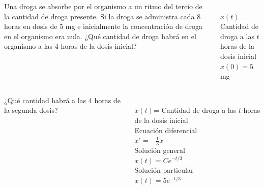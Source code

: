 \documentclass[aspectratio=149,10pt,xcolor=dvipsnames,t]{beamer}
\begin{document}
\begin{frame}
\begin{columns}
\begin{column}[T]{0.65\textwidth}
Una droga se absorbe por el organismo a un ritmo del tercio de la cantidad de droga presente. 
Si la droga se administra cada 8 horas en dosis de 5 mg e inicialmente la concentración de droga en el organismo era nula.
¿Qué cantidad de droga habrá en el organismo a las 4 horas de la dosis inicial?
\end{column}
\begin{column}[T]{0.35\textwidth}
\\
$x(t)$= Cantidad de droga a las $t$ horas de la dosis inicial\\
$x(0)= 5$ mg
\end{column}
\end{columns}
\end{frame}


\begin{frame}
\begin{columns}
\begin{column}[T]{0.65\textwidth}
¿Qué cantidad habrá a las 4 horas de la segunda dosis? 
\end{column}
\begin{column}[T]{0.35\textwidth}
\\
$x(t)$= Cantidad de droga a las $t$ horas de la dosis inicial\\
Ecuación diferencial\\
$x' = -\frac{1}{3}x$\\
Solución general\\
$x(t)=Ce^{-t/3}$\\
Solución particular\\
$x(t)=5e^{-t/3}$
\end{column}
\end{columns}
\end{frame}
\end{document}
